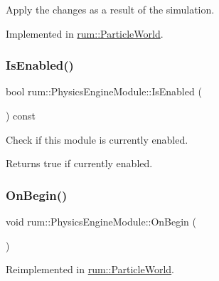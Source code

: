 Apply the changes as a result of the simulation. 

Implemented in \hyperlink{classrum_1_1_particle_world_a8537914776ce477d40ff97ed7b7730d2}{rum\+::\+Particle\+World}.

\mbox{\label{classrum_1_1_physics_engine_module_ae87521693e0b32f7ed741eb73b4db806}} 
\subsubsection{\texorpdfstring{Is\+Enabled()}{IsEnabled()}}
{\footnotesize\ttfamily bool rum\+::\+Physics\+Engine\+Module\+::\+Is\+Enabled (\begin{DoxyParamCaption}{ }\end{DoxyParamCaption}) const}

Check if this module is currently enabled. \begin{DoxyReturn}{Returns}
true if currently enabled. 
\end{DoxyReturn}
\mbox{\label{classrum_1_1_physics_engine_module_a6d599ea88574a867e22b569b8e83f5c2}} 
\subsubsection{\texorpdfstring{On\+Begin()}{OnBegin()}}
{\footnotesize\ttfamily void rum\+::\+Physics\+Engine\+Module\+::\+On\+Begin (\begin{DoxyParamCaption}{ }\end{DoxyParamCaption})\hspace{0.3cm}{\ttfamily [virtual]}}



Reimplemented in \hyperlink{classrum_1_1_particle_world_add8060f77975d47e984a0e0a3d1a0c0c}{rum\+::\+Particle\+World}.

\mbox{\label{classrum_1_1_physics_engine_module_a82e0d611a6a42f118d8ae92ff3ee91a0}} 
